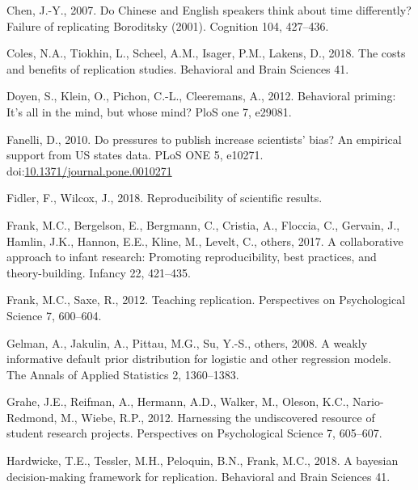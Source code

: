\documentclass[]{elsarticle} %
\newlength{\cslhangindent}
\newlength{\cslentryspacingunit} %
\newenvironment{CSLReferences}[2] %
 {%
  \setlength{\parindent}{0pt}
  \ifodd #1
  \let\oldpar\par
  \def\par{\hangindent=\cslhangindent\oldpar}
  \fi
  \setlength{\parskip}{#2\cslentryspacingunit}
 }%
 {}
\begin{document}
\begin{CSLReferences}{1}{0}
\leavevmode\hypertarget{ref-chen_chinese_2007}{}%
Chen, J.-Y., 2007. Do {Chinese} and {English} speakers think about time differently? {Failure} of replicating {Boroditsky} (2001). Cognition 104, 427--436.

\leavevmode\hypertarget{ref-coles2018costs}{}%
Coles, N.A., Tiokhin, L., Scheel, A.M., Isager, P.M., Lakens, D., 2018. The costs and benefits of replication studies. Behavioral and Brain Sciences 41.

\leavevmode\hypertarget{ref-doyen_behavioral_2012}{}%
Doyen, S., Klein, O., Pichon, C.-L., Cleeremans, A., 2012. Behavioral priming: It's all in the mind, but whose mind? PloS one 7, e29081.

\leavevmode\hypertarget{ref-fanelli_pressures_2010}{}%
Fanelli, D., 2010. Do pressures to publish increase scientists' bias? An empirical support from US states data. PLoS ONE 5, e10271. doi:\href{https://doi.org/10.1371/journal.pone.0010271}{10.1371/journal.pone.0010271}

\leavevmode\hypertarget{ref-fidler_reproducibility_2018}{}%
Fidler, F., Wilcox, J., 2018. Reproducibility of scientific results.

\leavevmode\hypertarget{ref-frank2017collaborative}{}%
Frank, M.C., Bergelson, E., Bergmann, C., Cristia, A., Floccia, C., Gervain, J., Hamlin, J.K., Hannon, E.E., Kline, M., Levelt, C., others, 2017. A collaborative approach to infant research: Promoting reproducibility, best practices, and theory-building. Infancy 22, 421--435.

\leavevmode\hypertarget{ref-frank2012teaching}{}%
Frank, M.C., Saxe, R., 2012. Teaching replication. Perspectives on Psychological Science 7, 600--604.

\leavevmode\hypertarget{ref-gelman_weakly_2008}{}%
Gelman, A., Jakulin, A., Pittau, M.G., Su, Y.-S., others, 2008. A weakly informative default prior distribution for logistic and other regression models. The Annals of Applied Statistics 2, 1360--1383.

\leavevmode\hypertarget{ref-grahe2012harnessing}{}%
Grahe, J.E., Reifman, A., Hermann, A.D., Walker, M., Oleson, K.C., Nario-Redmond, M., Wiebe, R.P., 2012. Harnessing the undiscovered resource of student research projects. Perspectives on Psychological Science 7, 605--607.

\leavevmode\hypertarget{ref-hardwicke2018bayesian}{}%
Hardwicke, T.E., Tessler, M.H., Peloquin, B.N., Frank, M.C., 2018. A bayesian decision-making framework for replication. Behavioral and Brain Sciences 41.


\end{CSLReferences}
\end{document}
